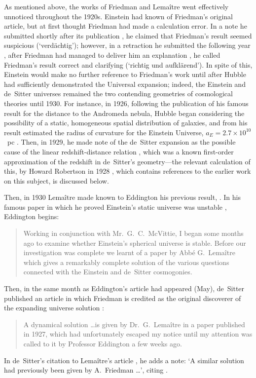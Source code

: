 As mentioned above, the works of Friedman and Lema\^{i}tre went effectively unnoticed throughout the 1920s. Einstein had known of Friedman's original article, but at first thought Friedman had made a calculation error. In a note he submitted shortly after its publication \cite{Einstein1922}, he claimed that Friedman's result seemed suspicious (`verd\"{a}chtig'); however, in a retraction he submitted the following year \cite{Einstein1923}, after Friedman had managed to deliver him an explanation \cite{Krasinski1999b}, he called Friedman's result correct and clarifying (`richtig und aufkl\"{a}rend'). In spite of this, Einstein would make no further reference to Friedman's work until after Hubble had sufficiently demonstrated the Universal expansion; indeed, the Einstein and de~Sitter universes remained the two contending geometries of cosmological theories until 1930. For instance, in 1926, following the publication of his famous result for the distance to the Andromeda nebula, Hubble began considering the possibility of a static, homogeneous spatial distribution of galaxies, and from his result estimated the radius of curvature for the Einstein Universe, $a_E=2.7\times10^{10}$~pc \cite{Hubble1926b}. Then, in 1929, he made note of the de~Sitter expansion as the possible cause of the linear redshift-distance relation \cite{Hubble1929}, which was a known first-order approximation of the redshift in de~Sitter's geometry---the relevant calculation of this, by Howard Robertson in 1928 \cite{Robertson1928}, which contains references to the earlier work on this subject, is discussed below.

Then, in 1930 Lema\^{i}tre made known to Eddington his previous result, \cite{Lemaitre1927}. In his famous paper in which he proved Einstein's static universe was unstable \cite{Eddington1930}, Eddington begins:
\begin{quotation}
Working in conjunction with Mr.~G.~C.~McVittie, I began some months ago to examine whether Einstein's spherical universe is stable. Before our investigation was complete we learnt of a paper by Abb\'{e} G.~Lema\^{i}tre which gives a remarkably complete solution of the various questions connected with the Einstein and de~Sitter cosmogonies.
\end{quotation} 
Then, in the same month as Eddington's article had appeared (May), de~Sitter published an article in which Friedman is credited as the original discoverer of the expanding universe solution \cite{deSitter1930}:
\begin{quotation}
A dynamical solution \ldots is given by Dr.~G.~Lema\^{i}tre in a paper published in 1927, which had unfortunately escaped my notice until my attention was called to it by Professor Eddington a few weeks ago.
\end{quotation}
In de~Sitter's citation to Lema\^{i}tre's article \cite{Lemaitre1927}, he adds a note: `A similar solution had previously been given by A.~Friedman \ldots', citing \cite{Friedmann1922}.

